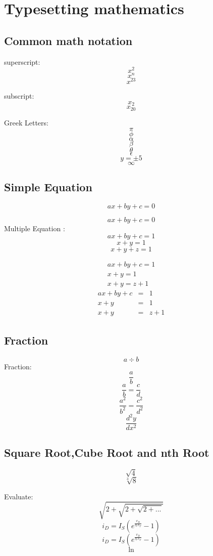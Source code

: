 \documentclass[12pt,a4paper]{report}
\begin{document}
\chapter{Typesetting mathematics}
\section{Common math notation}

superscript: \\
$$x^2$$   %
$$x^n$$
$$x^{23}$$

subscript: \\
$$x_2$$
$$x_{20}$$

Greek Letters: \\
$$\pi$$
$$\phi$$
$$\alpha$$
$$\beta$$
$$\theta$$
$$\epsilon$$
$$y=\pm5$$
$$\infty$$
\pagebreak
\section{Simple Equation}
$$ax+by+c=0$$

\begin{equation}
ax+by+c=0
\end{equation}
Multiple Equation : \\
$$ax+by+c=1$$
$$x+y=1$$
$$x+y+z=1$$

\begin{eqnarray*}%
ax+by+c=1\\
x+y=1\\
x+y=z+1
\end{eqnarray*}
\begin{eqnarray}
ax+by+c&=&1\\
x+y&=&1\\
x+y&=&z+1
\end{eqnarray}
\pagebreak
\section{Fraction}
$$a\div b$$ %
Fraction:
$$\frac{a}{b}$$
$$\frac{a}{b}=\frac{c}{d}$$
$$\frac{a^2}{b^2}=\frac{c^2}{d^2}$$
$$\frac{d^2y}{dx^2}$$
\pagebreak
\section{Square Root,Cube Root and nth Root}
$$\sqrt{4}$$%
$$\sqrt[3]{8}$$

Evaluate:
$$\sqrt{2+\sqrt{2+\sqrt{2+...}}}$$
\begin{equation}
i_{D}=I_{S}(e^{\frac{v_{D}}{\eta.v_T}}-1)
\end{equation}
$$i_{D}=I_{S}(e^{\frac{v_{D}}{\eta.v_T}}-1)$$
$$\ln$$
\end{document}
